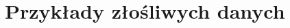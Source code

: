 \documentclass[
    left=2.5cm,         %
    right=2.5cm,        %
    top=2.5cm,          %
    bottom=3cm,         %
    bindingoffset=6mm,  %
    nohyphenation=false %
]{eiti/eiti-thesis}
\begin{document}
\section{Przykłady złośliwych danych}
\end{document}
